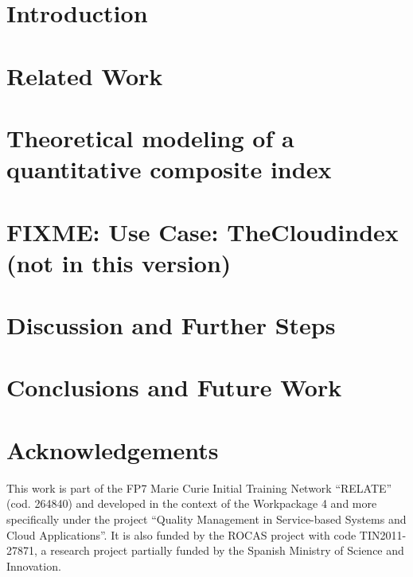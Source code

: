 \documentclass{llncs}
\begin{document}
\section{Introduction}

\section{Related Work}

\section{Theoretical modeling of a quantitative composite index}

\section{FIXME: Use Case: TheCloudindex (not in this version)}
\clearpage
\section{Discussion and Further Steps}

\section{Conclusions and Future Work}


\section{Acknowledgements}
This work is part of the FP7 Marie Curie Initial Training Network ``RELATE'' (cod. 264840) and developed in the context 
of the Workpackage 4 and more specifically under the project ``Quality Management in Service-based Systems and Cloud Applications''. It is 
also funded by the ROCAS project with code TIN2011-27871, a research project partially funded by the Spanish Ministry of Science and Innovation.

\clearpage



\end{document}
